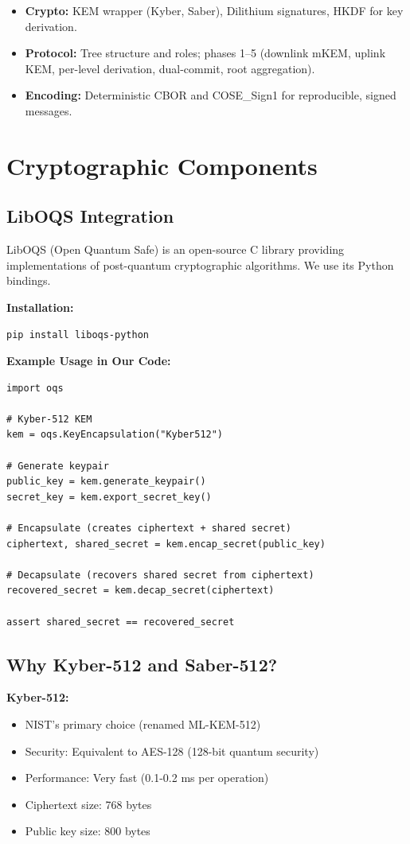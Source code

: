 \documentclass[12pt,a4paper]{report}
\begin{document}
\begin{itemize}
\item \textbf{Crypto:} KEM wrapper (Kyber, Saber), Dilithium signatures, HKDF for key derivation.
\item \textbf{Protocol:} Tree structure and roles; phases 1--5 (downlink mKEM, uplink KEM, per-level derivation, dual-commit, root aggregation).
\item \textbf{Encoding:} Deterministic CBOR and COSE\_Sign1 for reproducible, signed messages.
\end{itemize}

\section{Cryptographic Components}

\subsection{LibOQS Integration}

LibOQS (Open Quantum Safe) is an open-source C library providing implementations of post-quantum cryptographic algorithms. We use its Python bindings.

\textbf{Installation:}
\begin{verbatim}
pip install liboqs-python
\end{verbatim}

\textbf{Example Usage in Our Code:}

\begin{verbatim}
import oqs

# Kyber-512 KEM
kem = oqs.KeyEncapsulation("Kyber512")

# Generate keypair
public_key = kem.generate_keypair()
secret_key = kem.export_secret_key()

# Encapsulate (creates ciphertext + shared secret)
ciphertext, shared_secret = kem.encap_secret(public_key)

# Decapsulate (recovers shared secret from ciphertext)
recovered_secret = kem.decap_secret(ciphertext)

assert shared_secret == recovered_secret
\end{verbatim}

\subsection{Why Kyber-512 and Saber-512?}

\textbf{Kyber-512:}
\begin{itemize}
\item NIST's primary choice (renamed ML-KEM-512)
\item Security: Equivalent to AES-128 (128-bit quantum security)
\item Performance: Very fast (0.1-0.2 ms per operation)
\item Ciphertext size: 768 bytes
\item Public key size: 800 bytes
\end{itemize}
\end{document}
